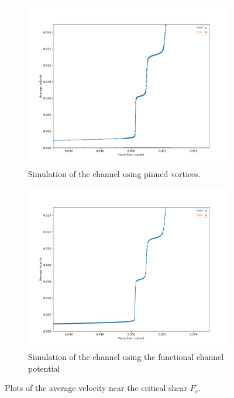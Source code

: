 \documentclass{article}
\numberwithin{equation}{section}
\begin{document}
\begin{figure}[htb]
\centering
\begin{subfigure}[t]{.49\textwidth}
    \centering
    \includegraphics[width=.9\linewidth]{results/Figures/Width1_velocities_Fc.png}
    \caption{Simulation of the channel using pinned vortices.}
    \label{fig:fc_vels_channel}
\end{subfigure}
\hfill
\begin{subfigure}[t]{.49\textwidth}
    \centering
\includegraphics[width=.9\linewidth]{results/Figures/Width1_velocities_analytic_Fc.png}
    \caption{Simulation of the channel using the functional channel potential}
    \label{fig:fc_vels_analytic}
\end{subfigure}
\caption{Plots of the average velocity near the critical shear $F_c$.}
\label{fig:fc_vels}
\end{figure}
\end{document}
